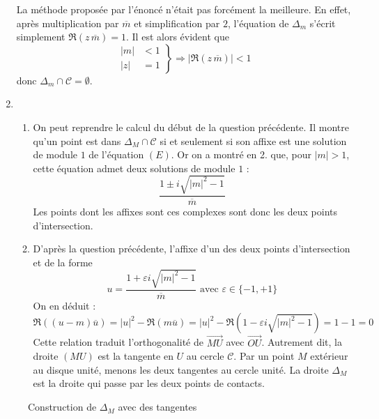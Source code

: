 \begin{enumerate}
La méthode proposée par l'énoncé n'était pas forcément la meilleure. En effet, après multiplication par $\overline{m}$ et simplification par $2$, l'équation de $\Delta_m$ s'écrit simplement $\Re(z\,\overline{m})=1$. Il est alors évident que
\begin{displaymath}
 \left. 
\begin{aligned}
 |m|&<1\\ |z|&=1
\end{aligned}
\right\rbrace 
\Rightarrow \left| \Re(z\,\overline{m})\right|<1
\end{displaymath}
 donc $\Delta_m \cap \mathcal C = \emptyset$.
 \item 
\begin{enumerate}
\item On peut reprendre le calcul du début de la question précédente. Il montre qu'un point est dans $\Delta_M \cap \mathcal C$ si et seulement si son affixe est une solution de module $1$ de l'équation $(E)$. Or on a montré en 2. que, pour $|m|>1$, cette équation admet deux solutions de module $1$ :
\begin{displaymath}
 \frac{1\pm i \sqrt{|m|^2-1}}{\overline{m}}
\end{displaymath}
 Les points dont les affixes sont ces complexes sont donc les deux points d'intersection.
\item D'après la question précédente, l'affixe d'un des deux points d'intersection et de la forme
\begin{displaymath}
 u = \frac{1 + \varepsilon i \sqrt{|m|^2-1}}{\overline{m}} \text{ avec } \varepsilon \in \{-1, +1\}
\end{displaymath}
On en déduit :
\begin{displaymath}
 \Re\left( (u-m)\overline{u}\right) = |u|^2 - \Re(m\overline{u})
= |u|^2 - \Re\left( 1 - \varepsilon i \sqrt{|m|^2-1}\right) =1-1=0 
\end{displaymath}
Cette relation traduit l'orthogonalité de $\overrightarrow{MU}$ avec $\overrightarrow{OU}$. Autrement dit, la droite $(MU)$ est la tangente en $U$ au cercle $\mathcal C$.\newline
Par un point $M$ extérieur au disque unité, menons les deux tangentes au cercle unité. La droite $\Delta_M$ est la droite qui passe par les deux points de contacts.
\end{enumerate}
\end{enumerate}
\begin{figure}[ht]
 \centering
 
 \caption{Construction de $\Delta_M$ avec des tangentes}
 \label{fig:Cdtepol_1}
\end{figure}
